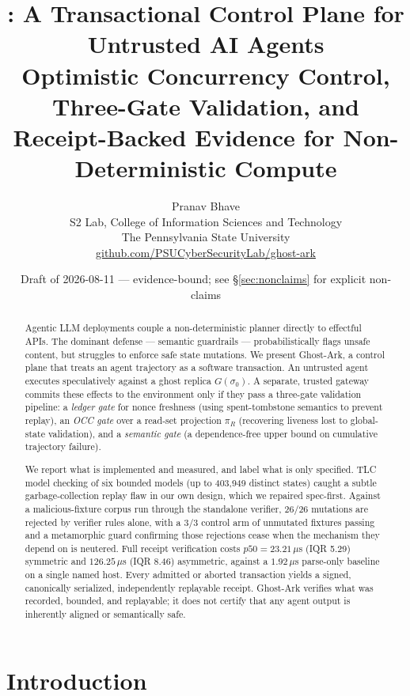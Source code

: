 \documentclass[10pt,twocolumn,letterpaper]{article}
\title{\vspace{-1.5em}\textbf{\ghostark{}: A Transactional Control Plane for Untrusted AI Agents}\\
\large Optimistic Concurrency Control, Three-Gate Validation, and Receipt-Backed
Evidence for Non-Deterministic Compute\vspace{-0.5em}}
\author{
  Pranav Bhave \\
  \normalsize S2 Lab, College of Information Sciences and Technology \\
  \normalsize The Pennsylvania State University \vspace{0.2em} \\
  \normalsize\href{https://github.com/PSUCyberSecurityLab/ghost-ark/}{\color{blue}github.com/PSUCyberSecurityLab/ghost-ark}
}
\date{Draft of 2026-08-11 --- evidence-bound; see \S\ref{sec:nonclaims} for explicit non-claims}
\newcommand{\evtwobasepfifty}{1.92}   %
\newcommand{\evtwohmacpfifty}{23.21}  %
\newcommand{\evtwohmaciqr}{5.29}      %
\newcommand{\evtworsapfifty}{126.25}  %
\newcommand{\evtworsaiqr}{8.46}       %
\newcommand{\evthreeintrinsic}{26/26}   %
\newcommand{\evthreecontrol}{3/3}       %
\newcommand{\plstates}{403{,}949}
\newcommand{\ghostark}{Ghost-Ark}
\newcommand{\piR}{\pi_R}
\begin{document}
\maketitle

\begin{abstract}
\noindent
Agentic LLM deployments couple a non-deterministic planner directly to effectful APIs.
The dominant defense --- semantic guardrails --- probabilistically flags unsafe content,
but struggles to enforce safe state mutations. We present \ghostark{}, a control plane
that treats an agent trajectory as a software transaction. An untrusted agent executes
speculatively against a ghost replica $G(\sigma_0)$. A separate, trusted gateway commits
these effects to the environment only if they pass a three-gate validation pipeline: a
\emph{ledger gate} for nonce freshness (using spent-tombstone semantics to prevent replay),
an \emph{OCC gate} over a read-set projection $\piR$ (recovering liveness lost to
global-state validation), and a \emph{semantic gate} (a dependence-free upper bound
on cumulative trajectory failure).

We report what is implemented and measured, and label what is only specified.
TLC model checking of six bounded models (up to \plstates{} distinct states) caught
a subtle garbage-collection replay flaw in our own design, which we repaired spec-first.
Against a malicious-fixture corpus run through the standalone verifier,
\evthreeintrinsic{} mutations are rejected by verifier rules alone, with a
\evthreecontrol{} control arm of unmutated fixtures passing and a metamorphic guard
confirming those rejections cease when the mechanism they depend on is neutered.
Full receipt verification costs $p50=\evtwohmacpfifty{}\,\mu$s (IQR \evtwohmaciqr{})
symmetric and $\evtworsapfifty{}\,\mu$s (IQR \evtworsaiqr{}) asymmetric, against a
$\evtwobasepfifty{}\,\mu$s parse-only baseline on a single named host.
Every admitted or aborted transaction yields a signed, canonically serialized,
independently replayable receipt. \ghostark{} verifies what was recorded, bounded, and
replayable; it does not certify that any agent output is inherently aligned or semantically safe.
\end{abstract}

\section{Introduction}
\label{sec:intro}
\end{document}
